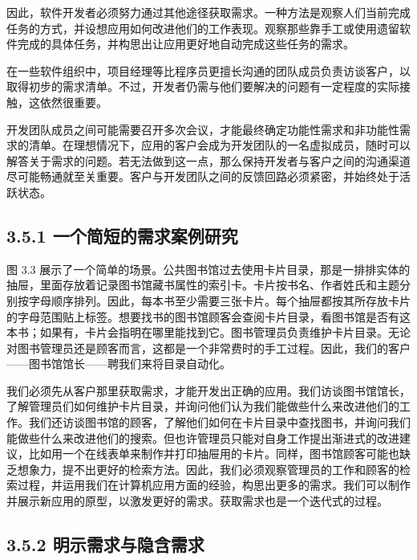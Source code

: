 因此，软件开发者必须努力通过其他途径获取需求。一种方法是观察人们当前完成任务的方式，并设想应用如何改进他们的工作表现。观察那些靠手工或使用遗留软件完成的具体任务，并构思出让应用更好地自动完成这些任务的需求。

在一些软件组织中，项目经理等比程序员更擅长沟通的团队成员负责访谈客户，以取得初步的需求清单。不过，开发者仍需与他们要解决的问题有一定程度的实际接触，这依然很重要。

开发团队成员之间可能需要召开多次会议，才能最终确定功能性需求和非功能性需求的清单。在理想情况下，应用的客户会成为开发团队的一名虚拟成员，随时可以解答关于需求的问题。若无法做到这一点，那么保持开发者与客户之间的沟通渠道尽可能畅通就至关重要。客户与开发团队之间的反馈回路必须紧密，并始终处于活跃状态。

\subsection{3.5.1 一个简短的需求案例研究}

图 3.3 展示了一个简单的场景。公共图书馆过去使用卡片目录，那是一排排实体的抽屉，里面存放着记录图书馆藏书属性的索引卡。卡片按书名、作者姓氏和主题分别按字母顺序排列。因此，每本书至少需要三张卡片。每个抽屉都按其所存放卡片的字母范围贴上标签。想要找书的图书馆顾客会查阅卡片目录，看图书馆是否有这本书；如果有，卡片会指明在哪里能找到它。图书管理员负责维护卡片目录。无论对图书管理员还是顾客而言，这都是一个非常费时的手工过程。因此，我们的客户——图书馆馆长——聘我们来将目录自动化。


我们必须先从客户那里获取需求，才能开发出正确的应用。我们访谈图书馆馆长，了解管理员们如何维护卡片目录，并询问他们认为我们能做些什么来改进他们的工作。我们还访谈图书馆的顾客，了解他们如何在卡片目录中查找图书，并询问我们能做些什么来改进他们的搜索。但也许管理员只能对自身工作提出渐进式的改进建议，比如用一个在线表单来制作并打印抽屉用的卡片。同样，图书馆顾客可能也缺乏想象力，提不出更好的检索方法。因此，我们必须观察管理员的工作和顾客的检索过程，并运用我们在计算机应用方面的经验，构思出更多的需求。我们可以制作并展示新应用的原型，以激发更好的需求。获取需求也是一个迭代式的过程。


\subsection{3.5.2 明示需求与隐含需求}

